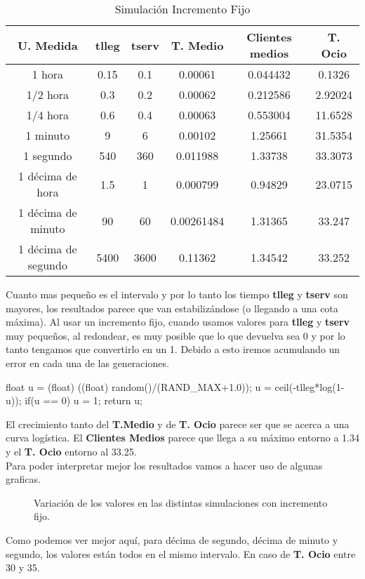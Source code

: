 \documentclass[12pt,a4paper]{article}
\begin{document}
\begin{table}[H]
	\centering	
	\begin{tabular}{cccccc} \toprule
		{U. Medida}&{tlleg} & {tserv} & {T. Medio} & {Clientes medios} & {T. Ocio} \\ \midrule
		1 hora & 0.15  & 0.1 & 0.00061 & 0.044432 & 0.1326 \\
		1/2 hora & 0.3  & 0.2 & 0.00062 &  0.212586 & 2.92024 \\
		1/4 hora  & 0.6 & 0.4 & 0.00063 & 0.553004 & 11.6528 \\		\midrule
		1 minuto & 9  & 6 & 0.00102 & 1.25661 & 31.5354 \\
		1 segundo  & 540 & 360 & 0.011988 & 1.33738  & 33.3073 \\		\midrule
		1 décima de hora  & 1.5 & 1 & 0.000799 & 0.94829  & 23.0715 \\
		1 décima de minuto  & 90 & 60 & 0.00261484 & 1.31365  & 33.247 \\
		1 décima de segundo  & 5400 & 3600 & 0.11362 & 1.34542  & 33.252 \\ 
		\midrule

	\end{tabular}
	\caption{Simulación Incremento Fijo} \label{tab:iincrementoijo}
\end{table}
Cuanto mas pequeño es el intervalo y por lo tanto los tiempo \textbf{tlleg} y \textbf{tserv} son mayores, los resultados parece que van estabilizándose (o llegando a una cota máxima). Al usar un incremento fijo, cuando usamos valores para \textbf{tlleg} y \textbf{tserv} muy pequeños, al redondear, es muy posible que lo que devuelva sea 0 y por lo tanto tengamos que convertirlo en un 1. Debido a esto iremos acumulando un error en cada una de las generaciones.
\begin{Verbatim*}
	float u = (float) ((float) random()/(RAND_MAX+1.0));
	u = ceil(-tlleg*log(1-u));
	if(u == 0)
		u = 1;
	return u;	
\end{Verbatim*}
El crecimiento tanto del \textbf{T.Medio} y de \textbf{T. Ocio} parece ser que se acerca a una curva logística. El \textbf{Clientes Medios} parece que llega a su máximo entorno a 1.34 y el \textbf{T. Ocio} entorno  al 33.25.\\
Para poder interpretar mejor los resultados vamos a hacer uso de algunas graficas. 
\begin{figure}[H]
	\centering
	\caption{Variación de los valores en las distintas simulaciones con incremento fijo.}
	
	\label{f:apartado1_1}
\end{figure}
Como podemos ver mejor aquí, para décima de segundo, décima de minuto y segundo, los valores están todos en el mismo intervalo. En caso de \textbf{T. Ocio} entre 30 y 35. 
\end{document}

